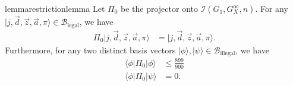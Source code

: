 \documentclass[../thesis-main/thesis-main]{subfiles}
\begin{document}
\begin{restatable}{lemma}{restrictionlemma}
\label{lem:Pi_0_restriction}
Let $\Pi_{0}$ be the projector onto $\mathcal{I}(G_{1},G_X^{\text{oc}},n)$. For any $|j,\vec{d},\vec{z},\vec{a},\pi\rangle\in\mathcal{B}_{\text{legal}}$, we have
\begin{align}
  \Pi_{0}|j,\vec{d},\vec{z},\vec{a},\pi\rangle & =|j,\vec{d},\vec{z},\vec{a},\pi\rangle\label{eq:subspace_eqn0}.
\end{align}
Furthermore, for any two distinct basis vectors $|\phi\rangle,|\psi\rangle\in\mathcal{B}_{\text{illegal}}$, we have 
\begin{align}
\langle\phi|\Pi_{0}|\phi\rangle & \leq\frac{899}{900}\label{eq:subspace_eqn1}\\
\langle\phi|\Pi_{0}|\psi\rangle & =0.\label{eq:subspace_eqn2}
\end{align}
\end{restatable}
\end{document}
